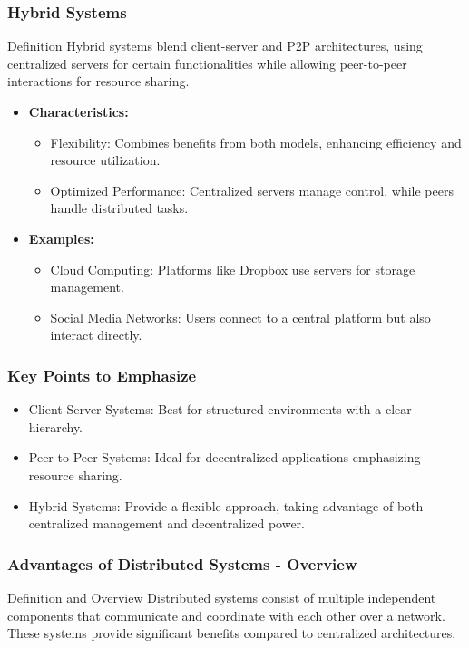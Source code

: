 \documentclass[aspectratio=169]{beamer}
\begin{document}
\begin{frame}[fragile]
    \frametitle{Hybrid Systems}
    \begin{block}{Definition}
        Hybrid systems blend client-server and P2P architectures, using centralized servers for certain functionalities while allowing peer-to-peer interactions for resource sharing.
    \end{block}

    \begin{itemize}
        \item \textbf{Characteristics:}
        \begin{itemize}
            \item Flexibility: Combines benefits from both models, enhancing efficiency and resource utilization.
            \item Optimized Performance: Centralized servers manage control, while peers handle distributed tasks.
        \end{itemize}
    
        \item \textbf{Examples:}
        \begin{itemize}
            \item Cloud Computing: Platforms like Dropbox use servers for storage management.
            \item Social Media Networks: Users connect to a central platform but also interact directly.
        \end{itemize}
    \end{itemize}
\end{frame}

\begin{frame}[fragile]
    \frametitle{Key Points to Emphasize}
    \begin{itemize}
        \item Client-Server Systems: Best for structured environments with a clear hierarchy.
        \item Peer-to-Peer Systems: Ideal for decentralized applications emphasizing resource sharing.
        \item Hybrid Systems: Provide a flexible approach, taking advantage of both centralized management and decentralized power.
    \end{itemize}
\end{frame}

\begin{frame}[fragile]
    \frametitle{Advantages of Distributed Systems - Overview}
    \begin{block}{Definition and Overview}
        Distributed systems consist of multiple independent components that communicate and coordinate with each other over a network. 
        These systems provide significant benefits compared to centralized architectures.
    \end{block}
\end{frame}
\end{document}
